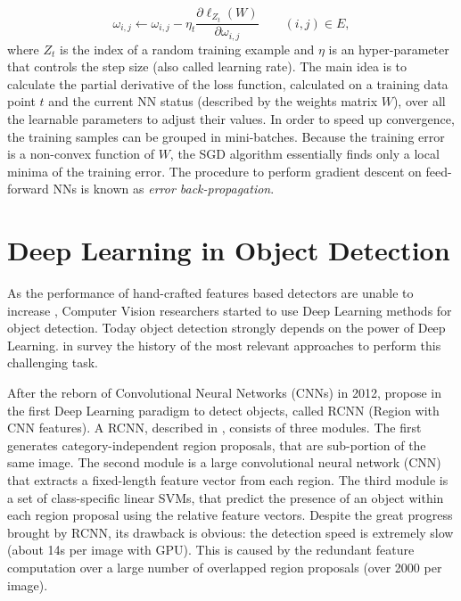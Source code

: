 \begin{equation}
\omega_{i, j} \leftarrow \omega_{i, j} - \eta_t \frac{\partial\ell_{Z_t}(W)}{\partial\omega_{i, j}} \quad \quad (i, j) \in E,
\end{equation}
where $Z_t$ is the index of a random training example and $\eta$ is an hyper-parameter that controls the step size (also called learning rate). The main idea is to calculate the partial derivative of the loss function, calculated on a training data point $t$ and the current NN status (described by the weights matrix $W$), over all the learnable parameters to adjust their values. In order to speed up convergence, the training samples can be grouped in mini-batches. Because the training error is a non-convex function of $W$, the SGD algorithm essentially finds only a local minima of the training error. The procedure to perform gradient descent on feed-forward NNs is known as \textit{error back-propagation}.
 
 \section{Deep Learning in Object Detection}
 As the performance of hand-crafted features based detectors are unable to increase \cite{deeplearningoverview}, Computer Vision researchers started to use Deep Learning methods for object detection. Today object detection strongly depends on the power of Deep Learning. \citeauthor{computervisionsurvey} in \cite{computervisionsurvey} survey the history of the most relevant approaches to perform this challenging task. 
 
 After the reborn of Convolutional Neural Networks (CNNs) in 2012, \citeauthor{rcnn} propose in \cite{rcnn} the first Deep Learning paradigm to detect objects, called RCNN (Region with CNN features). A RCNN, described in \cite{rcnn}, consists of three modules. The first generates category-independent region proposals, that are sub-portion of the same image. The second module is a large convolutional neural network (CNN) that extracts a fixed-length feature
 vector from each region. The third module is a set of class-specific linear SVMs, that predict the presence of an object within each region proposal using the relative feature vectors. Despite the great progress brought by RCNN, its drawback is obvious: the detection speed is extremely slow (about 14s per
 image with GPU). This is caused by the redundant feature computation over a large number of overlapped region proposals (over 2000 per image).
 
